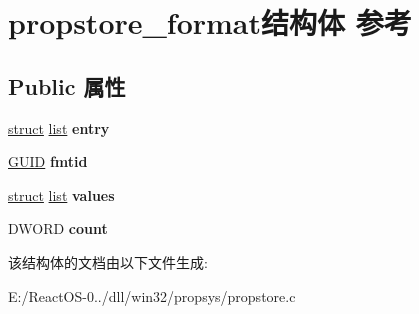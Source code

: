 \hypertarget{structpropstore__format}{}\section{propstore\+\_\+format结构体 参考}
\label{structpropstore__format}
\subsection*{Public 属性}
\begin{DoxyCompactItemize}
\item 
\mbox{\label{structpropstore__format_a36beec1db902390a209a4fb59985e2c9}} 
\hyperlink{interfacestruct}{struct} \hyperlink{classlist}{list} {\bfseries entry}
\item 
\mbox{\label{structpropstore__format_a4d946f5ccba98fe7790827497341315c}} 
\hyperlink{interface_g_u_i_d}{G\+U\+ID} {\bfseries fmtid}
\item 
\mbox{\label{structpropstore__format_a8462dc149f060a4baaa684f6837a4d02}} 
\hyperlink{interfacestruct}{struct} \hyperlink{classlist}{list} {\bfseries values}
\item 
\mbox{\label{structpropstore__format_ac3ea2ddaf4c397eeceb8fbcd80fe8342}} 
D\+W\+O\+RD {\bfseries count}
\end{DoxyCompactItemize}


该结构体的文档由以下文件生成\+:\begin{DoxyCompactItemize}
\item 
E\+:/\+React\+O\+S-\/0../dll/win32/propsys/propstore.\+c\end{DoxyCompactItemize}
